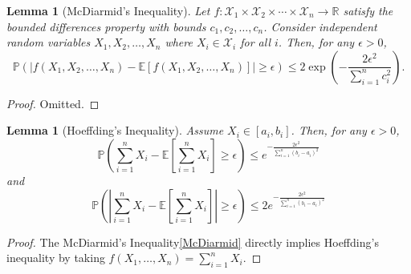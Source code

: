 \documentclass{article}[11]
\newtheorem{lemma}[theorem]{Lemma}
\begin{document}
	\begin{lemma}[McDiarmid's Inequality]\label{McDiarmid}
		Let $f : \mathcal{X}_1 \times \mathcal{X}_2 \times \cdots \times \mathcal{X}_n \to \mathbb{R}$ satisfy the bounded differences property with bounds $c_1, c_2, \ldots, c_n$. Consider independent random variables $X_1, X_2, \ldots, X_n$ where $X_i \in \mathcal{X}_i$ for all $i$. Then, for any $\epsilon > 0$,
		\[
		\mathbb{P}(|f(X_1, X_2, \ldots, X_n) - \mathbb{E}[f(X_1, X_2, \ldots, X_n)]| \geq \epsilon) \leq 2 \exp\left( - \frac{2\epsilon^2}{\sum_{i=1}^n c_i^2} \right).
		\]
	\end{lemma}
	\begin{proof}
		Omitted.
	\end{proof}
	
	\begin{lemma}[Hoeffding's Inequality]\label{Hoeffding}
		Assume $X_i \in [a_i, b_i]$. Then, for any $\epsilon>0$,
		\[
		\mathbb{P}\left( \sum_{i=1}^n X_i - \mathbb{E}\left[\sum_{i=1}^n X_i\right] \geq \epsilon \right) \leq e^{-\frac{2\epsilon^2}{\sum_{i=1}^n (b_i - a_i)^2}}
		\]
		and
		\[
		\mathbb{P}\left(\left| \sum_{i=1}^n X_i - \mathbb{E}\left[\sum_{i=1}^n X_i\right]\right| \geq \epsilon \right) \leq 2e^{-\frac{2\epsilon^2}{\sum_{i=1}^n (b_i - a_i)^2}}
		\]
	\end{lemma}
	\begin{proof}
		The McDiarmid's Inequality\eqref{McDiarmid} directly implies Hoeffding's inequality by taking $f(X_1, \ldots, X_n) = \sum_{i=1}^n X_i$.
	\end{proof}
	
\end{document}
